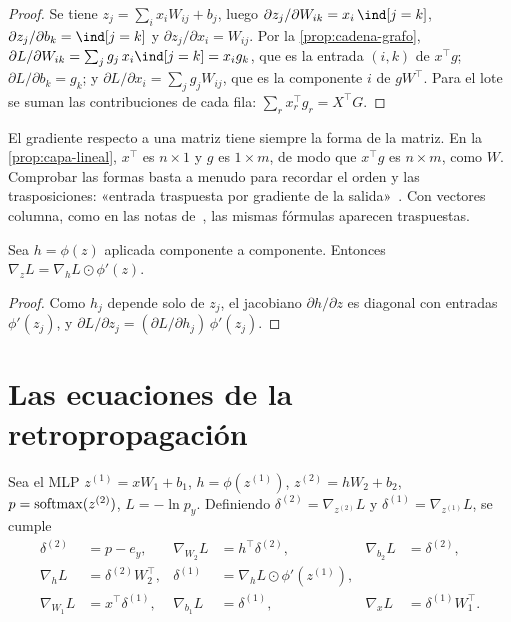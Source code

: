 \begin{proof}
Se tiene $z_j=\sum_ix_iW_{ij}+b_j$, luego $\partial z_j/\partial W_{ik}=x_i\,\ind[j=k]$, $\partial z_j/\partial b_k=\ind[j=k]$ y $\partial z_j/\partial x_i=W_{ij}$. Por la \cref{prop:cadena-grafo}, $\partial L/\partial W_{ik}=\sum_jg_j\,x_i\ind[j=k]=x_ig_k$, que es la entrada $(i,k)$ de $x^{\top}g$; $\partial L/\partial b_k=g_k$; y $\partial L/\partial x_i=\sum_jg_jW_{ij}$, que es la componente $i$ de $gW^{\top}$. Para el lote se suman las contribuciones de cada fila: $\sum_r x_r^{\top}g_r=X^{\top}G$.
\end{proof}

\begin{observacion}
El gradiente respecto a una matriz tiene siempre la forma de la matriz. En la \cref{prop:capa-lineal}, $x^{\top}$ es $n\times 1$ y $g$ es $1\times m$, de modo que $x^{\top}g$ es $n\times m$, como $W$. Comprobar las formas basta a menudo para recordar el orden y las trasposiciones: «entrada traspuesta por gradiente de la salida»~\cite{cs231n}. Con vectores columna, como en las notas de~\cite{cs231n}, las mismas fórmulas aparecen traspuestas.
\end{observacion}

\begin{proposicion}\label{prop:activacion}
Sea $h=\phi(z)$ aplicada componente a componente. Entonces $\nabla_{\!z}L=\nabla_{\!h}L\odot\phi'(z)$.
\end{proposicion}

\begin{proof}
Como $h_j$ depende solo de $z_j$, el jacobiano $\partial h/\partial z$ es diagonal con entradas $\phi'(z_j)$, y $\partial L/\partial z_j=(\partial L/\partial h_j)\,\phi'(z_j)$.
\end{proof}

\section{Las ecuaciones de la retropropagación}

\begin{teorema}\label{teo:backprop}
Sea el MLP $z^{(1)}=xW_1+b_1$, $h=\phi(z^{(1)})$, $z^{(2)}=hW_2+b_2$, $p=\operatorname{softmax}(z^{(2)})$, $L=-\ln p_y$. Definiendo $\delta^{(2)}=\nabla_{z^{(2)}}L$ y $\delta^{(1)}=\nabla_{z^{(1)}}L$, se cumple
\[
\begin{aligned}
\delta^{(2)}&=p-e_y, & \nabla_{\!W_2}L&=h^{\top}\delta^{(2)}, & \nabla_{\!b_2}L&=\delta^{(2)},\\
\nabla_{\!h}L&=\delta^{(2)}W_2^{\top}, & \delta^{(1)}&=\nabla_{\!h}L\odot\phi'(z^{(1)}), & & \\
\nabla_{\!W_1}L&=x^{\top}\delta^{(1)}, & \nabla_{\!b_1}L&=\delta^{(1)}, & \nabla_{\!x}L&=\delta^{(1)}W_1^{\top}.
\end{aligned}
\]
\end{teorema}

